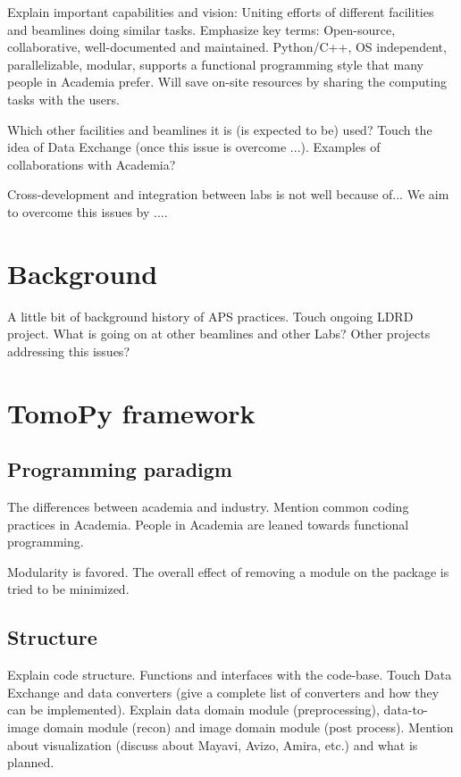 \documentclass[pdf]{iucr}              %
\begin{document}
Explain important capabilities and vision: Uniting efforts of different facilities and beamlines doing similar tasks. Emphasize key terms: Open-source, collaborative, well-documented and maintained. Python/C++, OS independent, parallelizable, modular, supports a functional programming style that many people in Academia prefer. Will save on-site resources by sharing the computing tasks with the users. 

Which other facilities and beamlines it is (is expected to be) used? Touch the idea of Data Exchange (once this issue is overcome ...). Examples of collaborations with Academia?

Cross-development and integration between labs is not well  because of... We aim to overcome this issues by ....

\section{Background}

A little bit of background history of APS practices. Touch ongoing LDRD project. What is going on at other beamlines and other Labs? Other projects addressing this issues?

\section{TomoPy framework}
\subsection{Programming paradigm}

The differences between academia and industry. Mention common coding practices in Academia. People in Academia are leaned towards functional programming.

Modularity is favored. The overall effect of removing a module on the package is tried to be minimized.

\subsection{Structure}

Explain code structure. Functions and interfaces with the code-base. Touch Data Exchange and data converters (give a complete list of converters and how they can be implemented). Explain data domain module (preprocessing), data-to-image domain module (recon) and image domain module (post process). Mention about visualization (discuss about Mayavi, Avizo, Amira, etc.) and what is planned.
\end{document}
